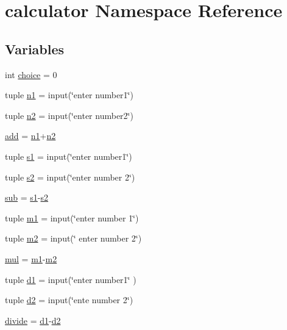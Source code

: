 \hypertarget{namespacecalculator}{\section{calculator Namespace Reference}
\label{namespacecalculator}
}
\subsection*{Variables}
\begin{DoxyCompactItemize}
\item 
int \hyperlink{namespacecalculator_a515623328688b8f1e3d0632aaa4d1d84}{choice} = 0
\item 
tuple \hyperlink{namespacecalculator_a36bd09ad7af2b355294cd40e66a73e32}{n1} = input(\char`\"{}enter number1\char`\"{})
\item 
tuple \hyperlink{namespacecalculator_a8ad5b68d17411aef3f785e25d608acb3}{n2} = input(\char`\"{}enter number2\char`\"{})
\item 
\hyperlink{namespacecalculator_a6944e5725a7014f1bd6ef08281cb2076}{add} = \hyperlink{namespacecalculator_a36bd09ad7af2b355294cd40e66a73e32}{n1}+\hyperlink{namespacecalculator_a8ad5b68d17411aef3f785e25d608acb3}{n2}
\item 
tuple \hyperlink{namespacecalculator_ad76d6157aba342d9fa3a217405d770d7}{s1} = input(\char`\"{}enter number1\char`\"{})
\item 
tuple \hyperlink{namespacecalculator_aecc555c4e1719571bf8730efa659d2ea}{s2} = input(\char`\"{}enter number 2\char`\"{})
\item 
\hyperlink{namespacecalculator_a527852b47c69128e54431d6304eb5403}{sub} = \hyperlink{namespacecalculator_ad76d6157aba342d9fa3a217405d770d7}{s1}-\/\hyperlink{namespacecalculator_aecc555c4e1719571bf8730efa659d2ea}{s2}
\item 
tuple \hyperlink{namespacecalculator_afa90d2ad046281727b8c96a591b420c7}{m1} = input(\char`\"{}enter number 1\char`\"{})
\item 
tuple \hyperlink{namespacecalculator_a8a81433b505a2cdf3a8a2a24f8e1e902}{m2} = input(\char`\"{} enter number 2\char`\"{})
\item 
\hyperlink{namespacecalculator_abebdec4b455059b8c28e6416ca8dc209}{mul} = \hyperlink{namespacecalculator_afa90d2ad046281727b8c96a591b420c7}{m1}-\/\hyperlink{namespacecalculator_a8a81433b505a2cdf3a8a2a24f8e1e902}{m2}
\item 
tuple \hyperlink{namespacecalculator_aa8b336bc530cecfedd8ade1e5e81c52a}{d1} = input(\char`\"{}enter number1\char`\"{} )
\item 
tuple \hyperlink{namespacecalculator_aadeba3e174f4ef054df2b4649e547062}{d2} = input(\char`\"{}ente number 2\char`\"{})
\item 
\hyperlink{namespacecalculator_ab0657f7331541886d291e42dc98edb56}{divide} = \hyperlink{namespacecalculator_aa8b336bc530cecfedd8ade1e5e81c52a}{d1}-\/\hyperlink{namespacecalculator_aadeba3e174f4ef054df2b4649e547062}{d2}
\end{DoxyCompactItemize}


